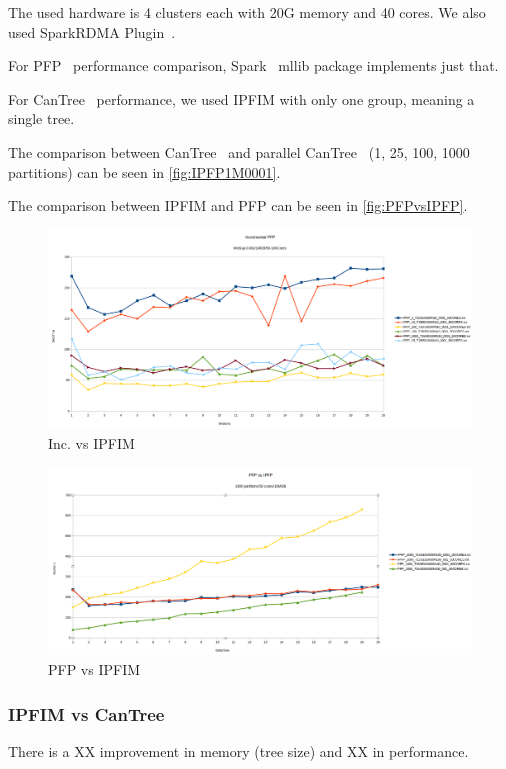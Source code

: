 \documentclass[sigconf, nonacm]{acmart}
\begin{document}
The used hardware is 4 clusters each with 20G memory and 40 cores. We also used SparkRDMA Plugin~\cite{SparkRDMA}.

For PFP~\cite{li2008pfp} performance comparison, Spark~\cite{spark} mllib package implements just that.

For CanTree~\cite{leung2005cantree} performance, we used IPFIM with only one group, meaning a single tree.

The comparison between CanTree~\cite{leung2005cantree} and parallel CanTree~\cite{leung2005cantree} (1, 25, 100, 1000 partitions) can be seen in \autoref{fig:IPFP1M0001}.

The comparison between IPFIM and PFP can be seen in \autoref{fig:PFPvsIPFP}.

\begin{figure}
  \centering
  \includegraphics[width=\linewidth]{figures/IPFP1M0001}
  \caption{Inc. vs IPFIM}
  \label{fig:IPFP1M0001}
\end{figure}

\begin{figure}
  \centering
  \includegraphics[width=\linewidth]{figures/PFPvsIPFP}
  \caption{PFP vs IPFIM}
  \label{fig:PFPvsIPFP}
\end{figure}


\subsubsection{IPFIM vs CanTree}
There is a XX improvement in memory (tree size) and XX in performance.
\end{document}
